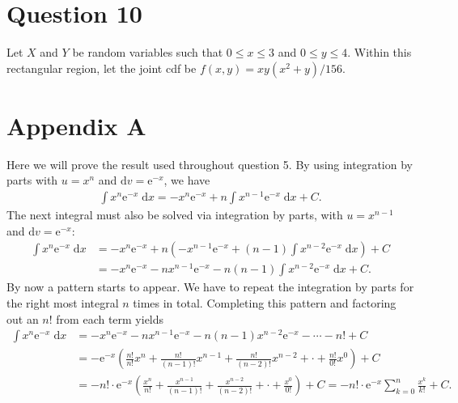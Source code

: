 \documentclass[10pt]{article}
\begin{document}
\section{Question 10} \noindent
Let \(X\) and \(Y\) be random variables such that \(0 \le x \le 3\) and \(0 \le y \le 4\). Within this rectangular region, let the joint cdf be 
\(f(x,y) = xy(x^2+y)/156\). 

\section{Appendix A} \noindent
Here we will prove the result used throughout question 5. By using integration by parts with \(u = x^n\) and \(\mathrm{d}v = \mathrm{e}^{-x}\), we have 
\begin{align*}
    \int x^n \mathrm{e}^{-x} \;\mathrm{d}x = -x^n \mathrm{e}^{-x} + n \int x^{n-1} \mathrm{e}^{-x} \;\mathrm{d}x + C.
\end{align*}
The next integral must also be solved via integration by parts, with \(u = x^{n-1}\) and \(\mathrm{d}v = \mathrm{e}^{-x}\):
\begin{align*}
    \int x^n \mathrm{e}^{-x} \;\mathrm{d}x &= -x^n \mathrm{e}^{-x} + n \left( -x^{n-1} \mathrm{e}^{-x} + (n-1) \int x^{n-2} \mathrm{e}^{-x} \;\mathrm{d}x  \right) + C \\
    &= -x^n \mathrm{e}^{-x} -nx^{n-1} \mathrm{e}^{-x} - n(n-1) \int x^{n-2} \mathrm{e}^{-x} \;\mathrm{d}x + C.
\end{align*}
By now a pattern starts to appear. We have to repeat the integration by parts for the right most integral \(n\) times in total. 
Completing this pattern and factoring out an \(n!\) from each term yields
\begin{align*}
    \int x^n \mathrm{e}^{-x} \;\mathrm{d}x &= -x^n \mathrm{e}^{-x} - nx^{n-1}\mathrm{e}^{-x} - n(n-1)x^{n-2}\mathrm{e}^{-x} - \cdots - n! + C\\
    &= -\mathrm{e}^{-x} \left( \frac{n!}{n!}x^{n} + \frac{n!}{(n-1)!}x^{n-1} + \frac{n!}{(n-2)!}x^{n-2} + \cdot + \frac{n!}{0!}x^0 \right) + C\\
    &= -n! \cdot \mathrm{e}^{-x} \left( \frac{x^n}{n!} + \frac{x^{n-1}}{(n-1)!} + \frac{x^{n-2}}{(n-2)!} + \cdot + \frac{x^0}{0!} \right) + C
    = -n! \cdot \mathrm{e}^{-x} \sum_{k=0}^n \frac{x^k}{k!} + C.
\end{align*}
\end{document}
